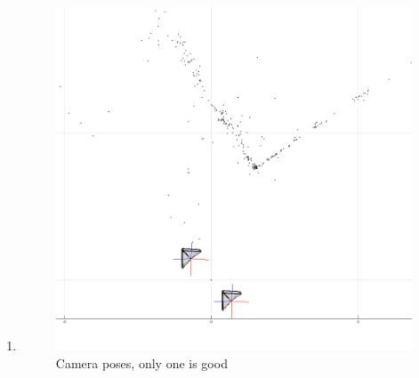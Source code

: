 \documentclass[10pt,letterpaper]{article}
\begin{document}
\begin{enumerate}[]
\item 
\begin{figure}[h!]
 \center
  \includegraphics[width=5in]{../images/camera_poses}
  \caption
   {Camera poses, only one is good}
\end{figure} \\


\newpage


\end{enumerate}
\end{document}
